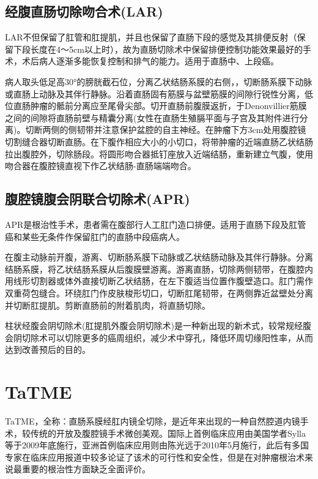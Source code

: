 \documentclass[a4paper,11pt,onecolumn,twoside]{article}
\begin{document}
\begin{multicols}{2}
    \subsection{经腹直肠切除吻合术(LAR)}
    LAR不但保留了肛管和肛提肌，并且也保留了直肠下段的感觉及其排便反射（保留下段长度在4～5cm以上时），故为直肠切除术中保留排便控制功能效果最好的手术，术后病人逐渐多能恢复控制和排气的能力。适用于直肠中、上段癌。

    病人取头低足高30°的膀胱截石位，分离乙状结肠系膜的右侧，，切断肠系膜下动脉或直肠上动脉及其伴行静脉。沿着直肠固有筋膜与盆壁筋膜的间隙行锐性分离，低位直肠肿瘤的骶前分离应至尾骨尖部。切开直肠前腹膜返折，于Denonvillier筋膜之间的间隙将直肠前壁与精囊分离(女性在直肠生殖膈平面与子宫及其附件进行分离)。切断两侧的侧韧带并注意保护盆腔的自主神经。在肿瘤下方3cm处用腹腔镜切割缝合器切断直肠。在下腹作相应大小的小切口，将带肿瘤的近端直肠乙状结肠拉出腹腔外，切除肠段。将圆形吻合器抵钉座放入近端结肠，重新建立气腹，使用吻合器在腹腔镜直视下作乙状结肠-直肠端端吻合。

    \subsection{腹腔镜腹会阴联合切除术(APR)}
    APR是根治性手术，患者需在腹部行人工肛门造口排便。适用于直肠下段及肛管癌和某些无条件作保留肛门的直肠中段癌病人\supercite{3}。

    在腹主动脉前开腹，游离、切断肠系膜下动脉或乙状结肠动脉及其伴行静脉。分离结肠系膜，将乙状结肠系膜从后腹膜壁游离。游离直肠，切除两侧韧带，在腹腔内用线形切割器或体外直接切断乙状结肠，在左下腹适当位置作腹壁造口。肛门需作双重荷包缝合。环绕肛门作皮肤梭形切口，切断肛尾韧带，在两侧靠近盆壁处分离并切断肛提肌。剪断直肠前的附着肌肉，将直肠切除。

    柱状经腹会阴切除术(肛提肌外腹会阴切除术)是一种新出现的新术式\supercite{4}，较常规经腹会阴切除术可以切除更多的癌周组织，减少术中穿孔，降低环周切缘阳性率，从而达到改善预后的目的。

    \section{TaTME}
    TaTME，全称：直肠系膜经肛内镜全切除，是近年来出现的一种自然腔道内镜手术，较传统的开放及腹腔镜手术微创美观。国际上首例临床应用由美国学者Sylla\supercite{5}等于2009年底施行，亚洲首例临床应用则由陈光远于2010年5月施行，此后有多国专家在临床应用报道中较多论证了该术的可行性和安全性\supercite{6,7,8}，但是在对肿瘤根治术来说最重要的根治性方面缺乏全面评价。


\end{multicols}
\end{document}
